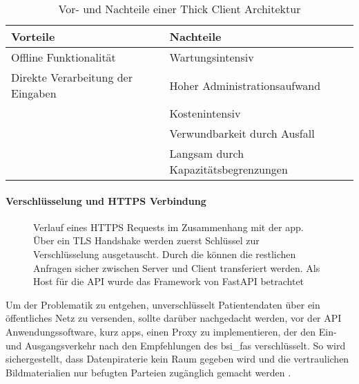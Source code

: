 \begin{table}[t]\vspace{1ex}\centering
  \begin{tabular*}{14cm}{l|l}
  \textbf{Vorteile} & \textbf{Nachteile}
  \\\hline\hline
  Offline Funktionalität             &  Wartungsintensiv               \\
  Direkte Verarbeitung der Eingaben  &  Hoher Administrationsaufwand   \\
                                     &  Kostenintensiv                 \\
                                     &  Verwundbarkeit durch Ausfall   \\
                                     &  Langsam durch Kapazitätsbegrenzungen
  \\\hline
  \end{tabular*}
  \caption[Vor- und Nachteile von Thick Client]{Vor- und Nachteile einer Thick Client Architektur}\label{cap:thickclient}
\vspace{1ex}\end{table}\label{table:thickclient}


\paragraph{Verschlüsselung und HTTPS Verbindung}\label{encryption}
\begin{figure}[t]
\begin{center}
 
\caption[Verlauf eines HTTPS Requests im Zusammenhang mit der \ac{app}]{Verlauf eines HTTPS Requests im Zusammenhang mit der \ac{app}. Über ein TLS Handshake werden zuerst Schlüssel zur Verschlüsselung ausgetauscht. Durch die können die restlichen Anfragen sicher zwischen Server und Client transferiert werden. Als Host für die API wurde das Framework von FastAPI betrachtet \cite{fastapi}}\label{cap:fastapi}
\end{center}
\end{figure}\label{fig:fastapi}

Um der Problematik zu entgehen, unverschlüsselt Patientendaten über ein öffentliches Netz zu versenden, sollte darüber nachgedacht werden, vor der API Anwendungssoftware, kurz \Acp{app}, einen Proxy zu implementieren, der den Ein- und Ausgangsverkehr nach den Empfehlungen des \Acp{bsi_fa} verschlüsselt. So wird sichergestellt, dass Datenpiraterie kein Raum gegeben wird und die vertraulichen Bildmaterialien nur befugten Parteien zugänglich gemacht werden \cite{fastapi}\cite{bsi}.


